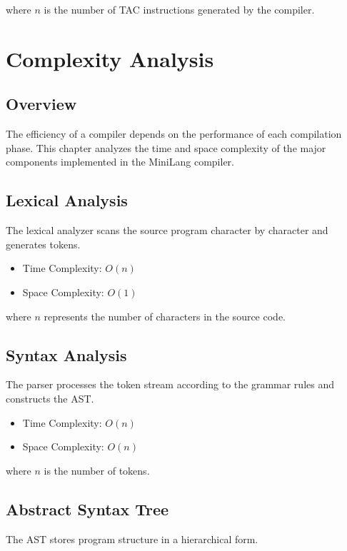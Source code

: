 \documentclass[12pt,a4paper]{report}
\begin{document}
where \(n\) is the number of TAC instructions generated by the compiler.

\chapter{Complexity Analysis}

\section{Overview}

The efficiency of a compiler depends on the performance of each compilation phase. This chapter analyzes the time and space complexity of the major components implemented in the MiniLang compiler.

\section{Lexical Analysis}

The lexical analyzer scans the source program character by character and generates tokens.

\begin{itemize}
    \item Time Complexity: \(O(n)\)
    \item Space Complexity: \(O(1)\)
\end{itemize}

where \(n\) represents the number of characters in the source code.

\section{Syntax Analysis}

The parser processes the token stream according to the grammar rules and constructs the AST.

\begin{itemize}
    \item Time Complexity: \(O(n)\)
    \item Space Complexity: \(O(n)\)
\end{itemize}

where \(n\) is the number of tokens.

\section{Abstract Syntax Tree}

The AST stores program structure in a hierarchical form.
\end{document}
